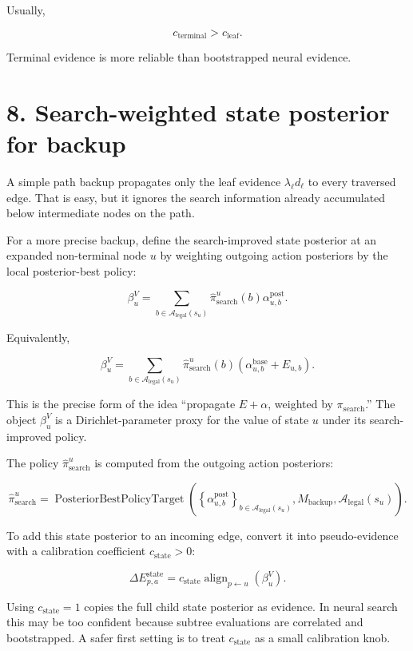 \documentclass[11pt]{article}
\newcommand{\Legal}{\mathcal{A}_{\mathrm{legal}}}
\newcommand{\Align}{\operatorname{align}}
\newcommand{\PosteriorBestPolicyTarget}{\operatorname{PosteriorBestPolicyTarget}}
\begin{document}
Usually,

\[
c_{\mathrm{terminal}} > c_{\mathrm{leaf}}.
\]

Terminal evidence is more reliable than bootstrapped neural evidence.

\section*{8. Search-weighted state posterior for backup}

A simple path backup propagates only the leaf evidence \(\lambda_\ell d_\ell\)
to every traversed edge. That is easy, but it ignores the search information
already accumulated below intermediate nodes on the path.

For a more precise backup, define the search-improved state posterior at an
expanded non-terminal node \(u\) by weighting outgoing action posteriors by the
local posterior-best policy:

\[
\beta^V_u
=
\sum_{b\in\Legal(s_u)}
\hat\pi_{\mathrm{search}}^u(b)
\alpha^{\mathrm{post}}_{u,b}.
\]

Equivalently,

\[
\beta^V_u
=
\sum_{b\in\Legal(s_u)}
\hat\pi_{\mathrm{search}}^u(b)
\left(
\alpha^{\mathrm{base}}_{u,b}+E_{u,b}
\right).
\]

This is the precise form of the idea ``propagate \(E+\alpha\), weighted by
\(\pi_{\mathrm{search}}\).'' The object \(\beta^V_u\) is a Dirichlet-parameter
proxy for the value of state \(u\) under its search-improved policy.

The policy \(\hat\pi_{\mathrm{search}}^u\) is computed from the outgoing action
posteriors:

\[
\hat\pi_{\mathrm{search}}^u
=
\PosteriorBestPolicyTarget
\left(
\left\{\alpha^{\mathrm{post}}_{u,b}\right\}_{b\in\Legal(s_u)},
M_{\mathrm{backup}},
\Legal(s_u)
\right).
\]

To add this state posterior to an incoming edge, convert it into pseudo-evidence
with a calibration coefficient \(c_{\mathrm{state}}>0\):

\[
\Delta E_{p,a}^{\mathrm{state}}
=
 c_{\mathrm{state}}
\Align_{p\leftarrow u}
\left(
\beta^V_u
\right).
\]

Using \(c_{\mathrm{state}}=1\) copies the full child state posterior as evidence.
In neural search this may be too confident because subtree evaluations are
correlated and bootstrapped. A safer first setting is to treat
\(c_{\mathrm{state}}\) as a small calibration knob.
\end{document}
